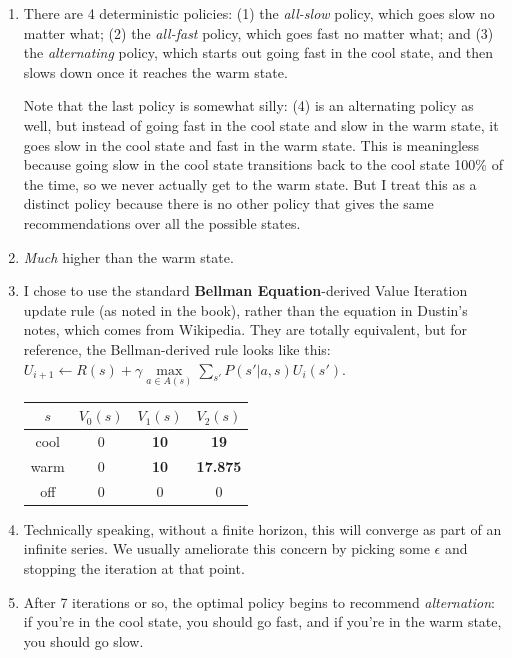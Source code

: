 \documentclass[11pt]{article}
\begin{document}
\begin{enumerate}
\item There are 4 deterministic policies: (1) the \textit{all-slow} policy, which goes slow no matter what; (2) the \textit{all-fast} policy, which goes fast no matter what; and (3) the \textit{alternating} policy, which starts out going fast in the cool state, and then slows down once it reaches the warm state.

Note that the last policy is somewhat silly: (4) is an alternating policy as well, but instead of going fast in the cool state and slow in the warm state, it goes slow in the cool state and fast in the warm state. This is meaningless because going slow in the cool state transitions back to the cool state 100\% of the time, so we never actually get to the warm state. But I treat this as a distinct policy because there is no other policy that gives the same recommendations over all the possible states.

\item \textit{Much} higher than the warm state.

\item I chose to use the standard \textbf{Bellman Equation}-derived Value Iteration update rule (as noted in the book), rather than the equation in Dustin's notes, which comes from Wikipedia. They are totally equivalent, but for reference, the Bellman-derived rule looks like this: $U_{i+1} \leftarrow R(s) + \gamma \underset{a \in A(s)}{\max} \sum_{s'} P(s' | a, s) U_i(s')$.

  \begin{tabular}{ | c | c | c | c | }
    \hline
    $s$ & $V_0(s)$ & $V_1(s)$ & $V_2(s)$ \\ \hline
    cool & 0 & \textbf{10} & \textbf{19} \\ \hline
    warm & 0 & \textbf{10} & \textbf{17.875} \\ \hline
    off & 0 & 0 & 0 \\
    \hline
  \end{tabular}

\item Technically speaking, without a finite horizon, this will converge as part of an infinite series. We usually ameliorate this concern by picking some $\epsilon$ and stopping the iteration at that point.

\item After 7 iterations or so, the optimal policy begins to recommend \textit{alternation}: if you're in the cool state, you should go fast, and if you're in the warm state, you should go slow.


\end{enumerate}
\end{document}
